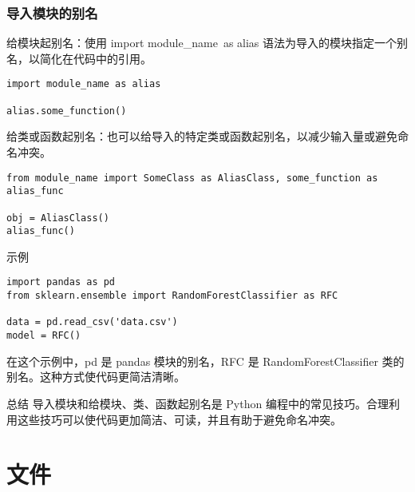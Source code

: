 \documentclass{article}
\begin{document}
\subsubsection{导入模块的别名}
给模块起别名：使用 import module\_name\ as alias 语法为导入的模块指定一个别名，以简化在代码中的引用。
\begin{lstlisting}[caption={示例Python代码}]
import module_name as alias

alias.some_function()
\end{lstlisting}
给类或函数起别名：也可以给导入的特定类或函数起别名，以减少输入量或避免命名冲突。
\begin{lstlisting}[caption={示例Python代码}]
from module_name import SomeClass as AliasClass, some_function as alias_func

obj = AliasClass()
alias_func()
\end{lstlisting}
示例
\begin{lstlisting}[caption={示例Python代码}]
import pandas as pd
from sklearn.ensemble import RandomForestClassifier as RFC

data = pd.read_csv('data.csv')
model = RFC()
\end{lstlisting}
在这个示例中，pd 是 pandas 模块的别名，RFC 是 RandomForestClassifier 类的别名。这种方式使代码更简洁清晰。

总结
导入模块和给模块、类、函数起别名是 Python 编程中的常见技巧。合理利用这些技巧可以使代码更加简洁、可读，并且有助于避免命名冲突。
\section{文件}
\end{document}
